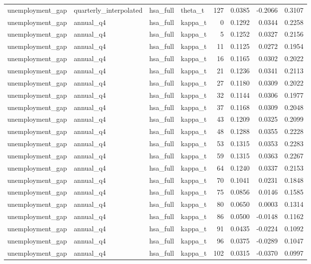 \begin{tabular}{llllrrrr}
unemployment\_gap & quarterly\_interpolated & hsa\_full & theta\_t & 127 & 0.0385 & -0.2066 & 0.3107 \\
unemployment\_gap & annual\_q4 & hsa\_full & kappa\_t & 0 & 0.1292 & 0.0344 & 0.2258 \\
unemployment\_gap & annual\_q4 & hsa\_full & kappa\_t & 5 & 0.1252 & 0.0327 & 0.2156 \\
unemployment\_gap & annual\_q4 & hsa\_full & kappa\_t & 11 & 0.1125 & 0.0272 & 0.1954 \\
unemployment\_gap & annual\_q4 & hsa\_full & kappa\_t & 16 & 0.1165 & 0.0302 & 0.2022 \\
unemployment\_gap & annual\_q4 & hsa\_full & kappa\_t & 21 & 0.1236 & 0.0341 & 0.2113 \\
unemployment\_gap & annual\_q4 & hsa\_full & kappa\_t & 27 & 0.1180 & 0.0309 & 0.2022 \\
unemployment\_gap & annual\_q4 & hsa\_full & kappa\_t & 32 & 0.1144 & 0.0306 & 0.1977 \\
unemployment\_gap & annual\_q4 & hsa\_full & kappa\_t & 37 & 0.1168 & 0.0309 & 0.2048 \\
unemployment\_gap & annual\_q4 & hsa\_full & kappa\_t & 43 & 0.1209 & 0.0325 & 0.2099 \\
unemployment\_gap & annual\_q4 & hsa\_full & kappa\_t & 48 & 0.1288 & 0.0355 & 0.2228 \\
unemployment\_gap & annual\_q4 & hsa\_full & kappa\_t & 53 & 0.1315 & 0.0353 & 0.2283 \\
unemployment\_gap & annual\_q4 & hsa\_full & kappa\_t & 59 & 0.1315 & 0.0363 & 0.2267 \\
unemployment\_gap & annual\_q4 & hsa\_full & kappa\_t & 64 & 0.1240 & 0.0337 & 0.2153 \\
unemployment\_gap & annual\_q4 & hsa\_full & kappa\_t & 70 & 0.1041 & 0.0231 & 0.1848 \\
unemployment\_gap & annual\_q4 & hsa\_full & kappa\_t & 75 & 0.0856 & 0.0146 & 0.1585 \\
unemployment\_gap & annual\_q4 & hsa\_full & kappa\_t & 80 & 0.0650 & 0.0003 & 0.1314 \\
unemployment\_gap & annual\_q4 & hsa\_full & kappa\_t & 86 & 0.0500 & -0.0148 & 0.1162 \\
unemployment\_gap & annual\_q4 & hsa\_full & kappa\_t & 91 & 0.0435 & -0.0224 & 0.1092 \\
unemployment\_gap & annual\_q4 & hsa\_full & kappa\_t & 96 & 0.0375 & -0.0289 & 0.1047 \\
unemployment\_gap & annual\_q4 & hsa\_full & kappa\_t & 102 & 0.0315 & -0.0370 & 0.0997 \\

\end{tabular}
